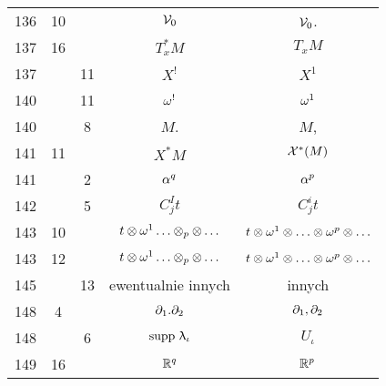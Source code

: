 \documentclass[a4paper,11pt]{article}
\begin{document}
\begin{center}
\begin{tabular}{|c|c|c|c|c|}
    136 & 10 & & $\mathcal{V}_{ 0 }$ & $\mathcal{V}_{ 0 }$. \\
    137 & 16 & & $T^{ * }_{ x }M$ & $T_{ x }M$ \\
    137 & & 11 & $X^{ ! }$ & $X^{ 1 }$ \\
    140 & & 11 & $\omega^{ ! }$ & $\omega^{ 1 }$ \\
    140 & &  8 & $M$. & $M$, \\
    141 & 11 & & $X^{ * } M$ & $\mathcal{X}^{ * }( M )$ \\
    141 & &  2 & $\alpha^{ q }$ & $\alpha^{ p }$ \\
    142 & &  5 & $C^{ I }_{ j } t$ & $C^{ i }_{ j } t$ \\
    143 & 10 & & $t \otimes \omega^{ 1 } \ldots \otimes_{ p } \otimes \ldots$
           & $t \otimes \omega^{ 1 } \otimes \ldots \otimes \omega^{ p } \otimes \ldots$ \\
    143 & 12 & & $t \otimes \omega^{ 1 } \ldots \otimes_{ p } \otimes \ldots$
           & $t \otimes \omega^{ 1 } \otimes \ldots \otimes \omega^{ p } \otimes \ldots$ \\
    145 & & 13 & ewentualnie innych & innych \\
    148 &  4 & & $\partial_{ 1 }.\partial_{ 2 }$ & $\partial_{ 1 }, \partial_{ 2 }$ \\
    148 & &  6 & $\mathrm{supp}\,\, \uplambda_{ \iota }$ & $U_{ \iota }$ \\
    149 & 16 & & $\mathbb{R}^{ q }$ & $\mathbb{R}^{ p }$ \\
    \hline
  \end{tabular}


\end{center}
\end{document}
